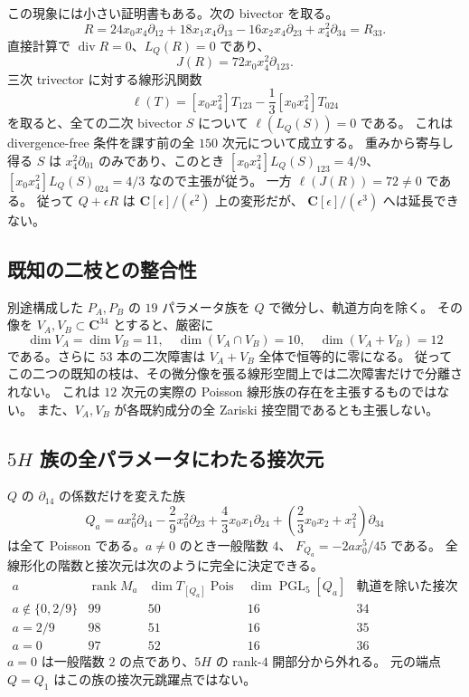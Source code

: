 この現象には小さい証明書もある。次の bivector を取る。
\[
 R=24x_0x_4\partial_{12}+18x_1x_4\partial_{13}
      -16x_2x_4\partial_{23}+x_4^2\partial_{34}=R_{33}.
\]
直接計算で $\operatorname{div}R=0$、$L_Q(R)=0$ であり、
\[
 J(R)=72x_0x_4^2\partial_{123}.
\]
三次 trivector に対する線形汎関数
\[
 \ell(T)=[x_0x_4^2]T_{123}-\frac13[x_0x_4^2]T_{024}
\]
を取ると、全ての二次 bivector $S$ について $\ell(L_Q(S))=0$ である。
これは divergence-free 条件を課す前の全 $150$ 次元について成立する。
重みから寄与し得る $S$ は $x_4^2\partial_{01}$ のみであり、このとき
$[x_0x_4^2]L_Q(S)_{123}=4/9$、
$[x_0x_4^2]L_Q(S)_{024}=4/3$ なので主張が従う。
一方 $\ell(J(R))=72\ne0$ である。
従って $Q+\epsilon R$ は $\mathbf C[\epsilon]/(\epsilon^2)$ 上の変形だが、
$\mathbf C[\epsilon]/(\epsilon^3)$ へは延長できない。

\subsection{既知の二枝との整合性}

別途構成した $P_A,P_B$ の $19$ パラメータ族を $Q$ で微分し、軌道方向を除く。
その像を $V_A,V_B\subset\mathbf C^{34}$ とすると、厳密に
\[
 \dim V_A=\dim V_B=11,\quad
 \dim(V_A\cap V_B)=10,\quad
 \dim(V_A+V_B)=12
\]
である。さらに $53$ 本の二次障害は $V_A+V_B$ 全体で恒等的に零になる。
従ってこの二つの既知の枝は、その微分像を張る線形空間上では二次障害だけで分離されない。
これは $12$ 次元の実際の Poisson 線形族の存在を主張するものではない。
また、$V_A,V_B$ が各既約成分の全 Zariski 接空間であるとも主張しない。

\subsection{\texorpdfstring{$5H$}{5H} 族の全パラメータにわたる接次元}

$Q$ の $\partial_{14}$ の係数だけを変えた族
\[
 Q_a=ax_0^2\partial_{14}-\frac29x_0^2\partial_{23}
       +\frac43x_0x_1\partial_{24}
       +\left(\frac23x_0x_2+x_1^2\right)\partial_{34}
\]
は全て Poisson である。$a\ne0$ のとき一般階数 $4$、
$F_{Q_a}=-2ax_0^5/45$ である。
全線形化の階数と接次元は次のように完全に決定できる。
\[
\begin{array}{c|c|c|c|c}
 a&\operatorname{rank}M_a&\dim T_{[Q_a]}\operatorname{Pois}
 &\dim \operatorname{PGL}_5[Q_a]&\text{軌道を除いた接次元}\\\hline
 a\notin\{0,2/9\}&99&50&16&34\\
 a=2/9&98&51&16&35\\
 a=0&97&52&16&36
\end{array}
\]
$a=0$ は一般階数 $2$ の点であり、$5H$ の rank-$4$ 開部分から外れる。
元の端点 $Q=Q_1$ はこの族の接次元跳躍点ではない。

